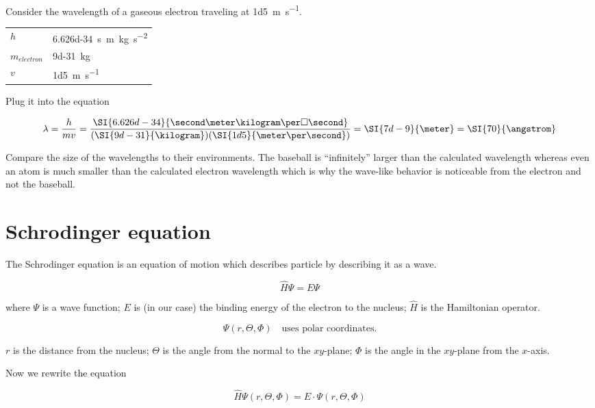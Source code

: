\documentclass[../mit-general-chemistry.tex]{subfiles}
\begin{document}
\begin{example}
  Consider the wavelength of a gaseous electron traveling at
  \SI{1d5}{\meter\per\second}.

  \begin{tabular}{ll}
    $h$ & \SI{6.626d-34}{\second\meter\kilogram\per\square\second} \\
    $m_{electron}$ & \SI{9d-31}{\kilogram} \\
    $v$ & \SI{1d5}{\meter\per\second} \\
  \end{tabular}

  Plug it into the equation

  \begin{equation*}
    \lambda = \frac{h}{mv} = \frac{\SI{6.626d-34}{\second\meter\kilogram\per\square\second}}{(\SI{9d-31}{\kilogram})(\SI{1d5}{\meter\per\second})}
    = \SI{7d-9}{\meter} = \SI{70}{\angstrom}
  \end{equation*}
  
\end{example}

Compare the size of the wavelengths to their environments. The
baseball is ``infinitely'' larger than the calculated wavelength
whereas even an atom is much smaller than the calculated electron
wavelength which is why the wave-like behavior is noticeable from the
electron and not the baseball.




\section{Schrodinger equation}

The Schrodinger equation is an equation of motion which describes
particle by describing it as a wave.

\begin{definition}
  \begin{equation}
    \hat{H}\Psi = E\Psi
  \end{equation}

  where $\Psi$ is a wave function; $E$ is (in our case) the binding
  energy of the electron to the nucleus; $\hat{H}$ is the Hamiltonian
  operator.

  \begin{equation*}
    \Psi(r, \Theta, \Phi) \quad\text{uses polar coordinates.}
  \end{equation*}

  $r$ is the distance from the nucleus; $\Theta$ is the angle from the
  normal to the $xy$-plane; $\Phi$ is the angle in the $xy$-plane from
  the $x$-axis.

  Now we rewrite the equation

  \begin{equation}
    \hat{H}\Psi(r, \Theta, \Phi) = E\cdot \Psi(r, \Theta, \Phi)
  \end{equation}
\end{definition}
\end{document}
